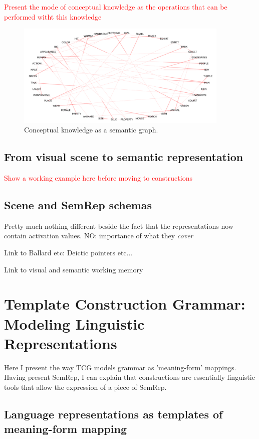 \documentclass{article}
\newcommand\todo[1]{\textcolor{red}{#1}}
\begin{document}
\todo{Present the mode of conceptual knowledge as the operations that can be performed witht this knowledge}

\begin{figure}[H]
	\centering
	\includegraphics[width=4.0in]{Figures/conceptual_knowledge.png}
	\caption{Conceptual knowledge as a semantic graph.}
	\label{fig:conceptual_knowledge}
\end{figure}

\subsection{From visual scene to semantic representation}
\todo{Show a working example here before moving to constructions}


\subsection{Scene and SemRep schemas}
Pretty much nothing different beside the fact that 
the representations now contain activation values.
NO: importance of what they \emph{cover}

Link to Ballard etc: Deictic pointers etc...

Link to visual and semantic working memory

\section{Template Construction Grammar: Modeling Linguistic Representations}

Here I present the way TCG models grammar as 'meaning-form' mappings. Having present SemRep, I can explain that constructions are essentially linguistic tools that allow the expression of a piece of SemRep.

\subsection{Language representations as templates of meaning-form mapping}
\end{document}
